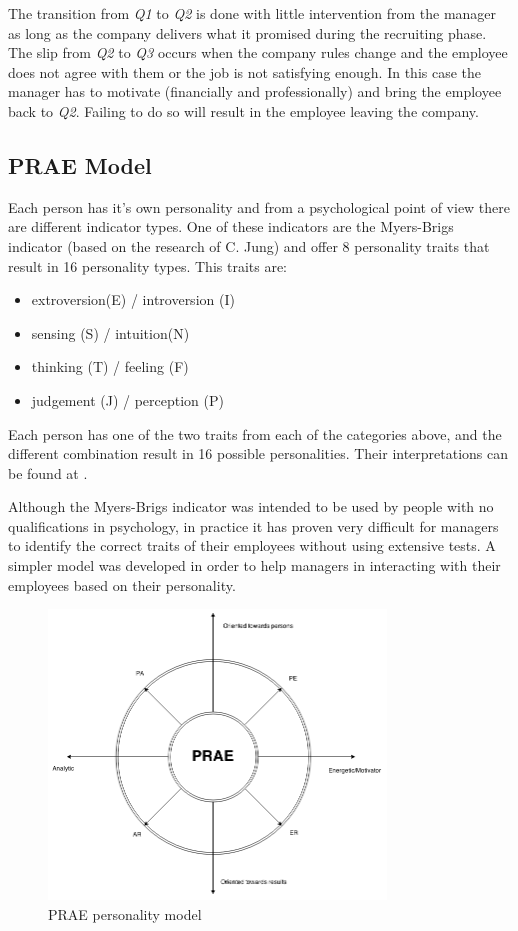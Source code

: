The transition from \textit{Q1} to \textit{Q2} is done with little intervention from the manager as long as the company delivers what it promised during the recruiting phase. The slip from \textit{Q2} to \textit{Q3} occurs when the company rules change and the employee does not agree with them or the job is not satisfying enough. In this case the manager has to motivate (financially and professionally) and bring the employee back to \textit{Q2}. Failing to do so will result in the employee leaving the company.
\subsection{PRAE Model}
\label{subsec:prae}

Each person has it's own personality and from a psychological point of view there are different indicator types. One of these indicators are the Myers-Brigs indicator \cite{myers} (based on the research of C. Jung) and offer 8 personality traits that result in 16 personality types. This traits are:
\begin{itemize}
\item extroversion(E) / introversion (I)
\item sensing (S) / intuition(N)
\item thinking (T) / feeling (F) 
\item judgement (J) / perception (P)
\end{itemize}
Each person has one of the two traits from each of the categories above, and the different combination result in 16 possible personalities. Their interpretations can be found at \cite{mbf}.

Although the Myers-Brigs indicator was intended to be used by people with no qualifications in psychology, in practice it has proven very difficult for managers to identify the correct traits of their employees without using extensive tests. A simpler model was developed in order to help managers in interacting with their employees based on their personality. 

\begin{figure}[h]
\centering
\includegraphics[width=0.8\textwidth]{img/prae.png}
\caption{PRAE personality model}
\label{fig:prae}
\end{figure}

